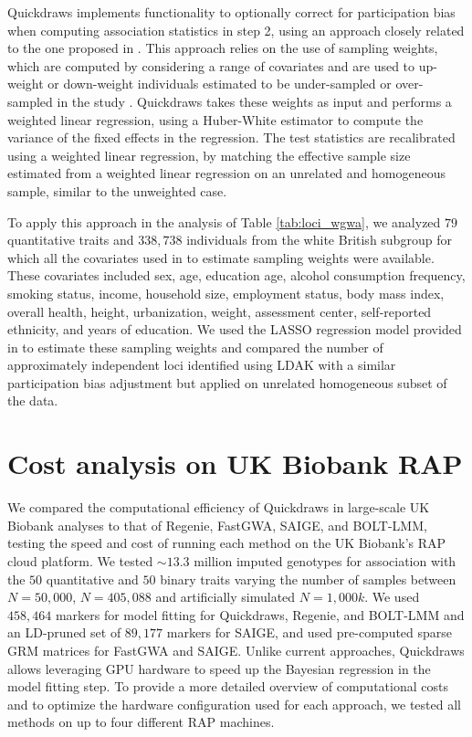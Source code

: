 Quickdraws implements functionality to optionally correct for participation bias when computing association statistics in step 2, using an approach closely related to the one proposed in \cite{schoeler2023participation}.
%
This approach relies on the use of sampling weights, which are computed by considering a range of covariates and are used to up-weight or down-weight individuals estimated to be under-sampled or over-sampled in the study \cite{schoeler2023participation}.
%
Quickdraws takes these weights as input and performs a weighted linear regression, using a Huber-White estimator to compute the variance of the fixed effects in the regression.
%
The test statistics are recalibrated using a weighted linear regression, by matching the effective sample size estimated from a weighted linear regression on an unrelated and homogeneous sample, similar to the unweighted case.
%

%
To apply this approach in the analysis of Table \ref{tab:loci_wgwa}, we analyzed $79$ quantitative traits and $338{,}738$ individuals from the white British subgroup for which all the covariates used in \cite{schoeler2023participation} to estimate sampling weights were available.
%
These covariates included sex, age, education age, alcohol consumption frequency, smoking status, income, household size, employment status, body mass index, overall health, height, urbanization, weight, assessment center, self-reported ethnicity, and years of education.
%
We used the LASSO regression model provided in \cite{schoeler2023participation} to estimate these sampling weights and compared the number of approximately independent loci identified using LDAK with a similar participation bias adjustment but applied on unrelated homogeneous subset of the data.
%

\section{Cost analysis on UK Biobank RAP}
\label{sec:ch5-cost}

We compared the computational efficiency of Quickdraws in large-scale UK Biobank analyses to that of Regenie, FastGWA, SAIGE, and BOLT-LMM, testing the speed and cost of running each method on the UK Biobank's RAP cloud platform.
%
We tested ${\sim}13.3$ million imputed genotypes for association with the $50$ quantitative and $50$ binary traits varying the number of samples between $N=50{,}000$, $N=405{,}088$ and artificially simulated $N=1{,}000k$.
%
We used $458{,}464$ markers for model fitting for Quickdraws, Regenie, and BOLT-LMM and an LD-pruned set of $89{,}177$ markers for SAIGE, and used pre-computed sparse GRM matrices for FastGWA and SAIGE.
%
Unlike current approaches, Quickdraws allows leveraging GPU hardware to speed up the Bayesian regression in the model fitting step.
%
To provide a more detailed overview of computational costs and to optimize the hardware configuration used for each approach, we tested all methods on up to four different RAP machines.

